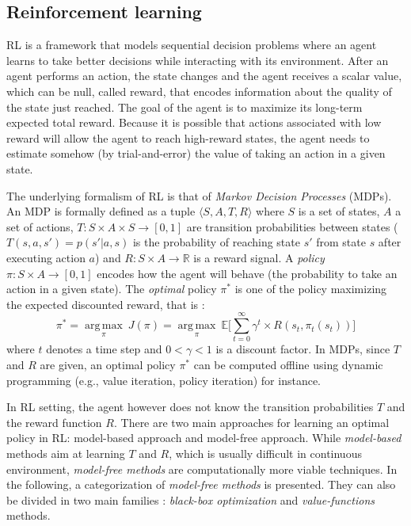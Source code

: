 \subsection{Reinforcement learning}

RL is a framework that models sequential decision
problems where an agent learns to take better decisions while interacting with
its environment. After an agent performs an action, the state changes and the
agent receives a scalar value, which can be null, called reward, that encodes information
about the quality of the state just reached. The goal of the agent is to maximize
its long-term expected total reward. Because it is possible that actions associated 
with low reward will allow the agent to reach high-reward states, the agent
needs to estimate somehow (by trial-and-error) the value of taking an action in
a given state.

The underlying formalism of RL is that of {\em Markov Decision Processes} (MDPs).
An MDP is formally defined as a tuple $\langle S, A, T, R \rangle$ where $S$ is a set of states, $A$ a set of actions, $T : S \times A \times S \rightarrow [0, 1]$ 
are transition probabilities between states
($T(s,a,s')=p(s'|a,s)$ is the probability of reaching state $s'$ from state $s$ after executing action $a$) and 
$R : S \times A \rightarrow \mathbb{R}$ is a reward signal. A \textit{policy} $\pi : S \times A \rightarrow [0, 1]$ encodes how the agent will behave (the probability
to take an action in a given state).
The {\em optimal} policy $\pi^*$ is one of the policy maximizing the expected discounted reward, that is :
\begin{equation}
\pi^* = \underset{\pi}{\operatorname{arg\,max}}\ J(\pi) = \underset{\pi}{\operatorname{arg\,max}}\ \mathbb{E} \Big[ \sum\limits_{t=0}^{\infty} \gamma^t \times R(s_t, \pi_t(s_t)) \Big]
\end{equation}
where $t$ denotes a time step and $0 < \gamma < 1$ is a discount factor.
In MDPs, since $T$ and $R$ are given, an optimal policy $\pi^*$ can be computed offline using dynamic programming (e.g., value iteration, policy                                                                  
iteration) \cite{Howard1960} for instance.

In RL setting, the agent however does not know the transition probabilities $T$ and the reward function $R$.
There are two main approaches for learning an optimal policy in RL: model-based approach and model-free approach.
While {\em model-based} methods aim at learning $T$ and $R$, which is usually difficult in continuous environment,
{\em model-free methods} are computationally more viable techniques.
In the following, a categorization of {\em model-free methods} is presented.
They can also be divided in two main families : {\em black-box optimization} and {\em value-functions} methods.


